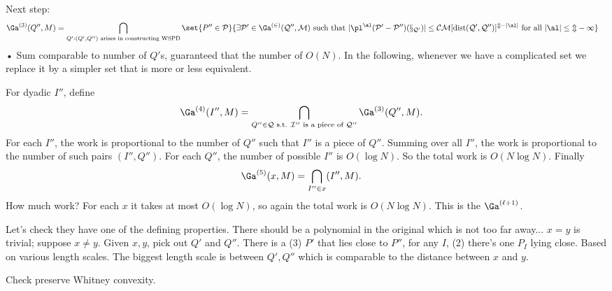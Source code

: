 Next step:
\begin{align}
\Ga^{(3)}(Q'',M) &= \bigcap_{Q': (Q',Q'')\text{ arises in constructing WSPD}}
\set{P''\in \cal P}{\exists P'\in \Ga^{(2)}(Q'', M) \text{ such that }|\pl^\al (P'-P'')(x_{Q'})| \le CM [\text{dist}(Q',Q'')]^{m-|\al|}\text{ for all }|\al|\le m-1}
\end{align}•
Sum comparable to number of $Q'$s, guaranteed that the number of $O(N)$.
In the following, whenever we have a complicated set we replace it by a simpler set that is more or less equivalent.

For dyadic $I''$,  define
\begin{align}
\Ga^{(4)}(I'', M) 
&=
\bigcap_{Q''\in \cal Q\text{ s.t. }I''\text{ is a piece of }Q''}
\Ga^{(3)}(Q'',M).
\end{align}
For each $I''$, the work is proportional to the number of $Q''$ such that $I''$ is a piece of $Q''$. Summing over all $I''$, the work is proportional to the number of such pairs $(I'',Q'')$. For each $Q''$, the number of possible $I''$ is $O(\log N)$. So the total work is $O(N\log N)$. 
Finally 
\begin{align}
\Ga^{(5)}(x,M) & = \bigcap_{I''\in x} (I'', M).
\end{align}
How much work? For each $x$ it takes at most $O(\log N)$, so again the total work is $O(N\log N)$.
This is the $\Ga^{(\ell+1)}$. 

Let's check they have one of the defining properties. There should be a polynomial in the original which is not too far away...
$x=y$ is trivial; suppose $x\ne y$. 
Given $x,y$, pick out $Q'$ and $Q''$. There is a (3) $P'$ that lies close to $P''$, for any $I$, (2) there's one $P_I$ lying close. Based on various length scales. The biggest length scale is between $Q',Q''$ which is comparable to the distance between $x$ and $y$.

Check preserve Whitney convexity.
